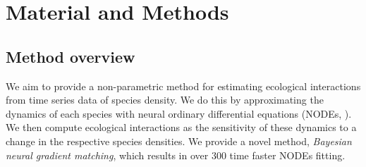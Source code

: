 \documentclass[11pt, oneside]{article}
\begin{document}
% 
% 

\section{Material and Methods}

\subsection{Method overview}

We aim to provide a non-parametric method for estimating ecological interactions from time series data of species density. 
We do this by approximating the dynamics of each species with neural ordinary differential equations (NODEs, \cite{Bonnaffe2021a}). 
We then compute ecological interactions as the sensitivity of these dynamics to a change in the respective species densities.
We provide a novel method, \textit{Bayesian neural gradient matching}, which results in over 300 time faster NODEs fitting.
\end{document}
